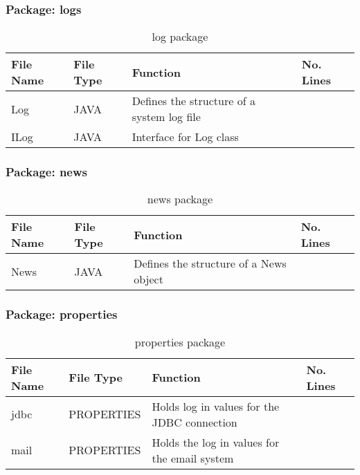 \subsubsection{Package: logs}
\begin{table}[H]
\begin{center}
    \begin{tabular}{| l | l | l| p{1cm} |}
    \hline
    File Name & File Type & Function & No. Lines\\ \hline
    Log & JAVA & Defines the structure of a system log file\\ \hline
	ILog & JAVA & Interface for Log class\\ \hline
    \end{tabular}
\end{center}
\caption{log package}
\end{table}

\subsubsection{Package: news}
\begin{table}[H]
\begin{center}
     \begin{tabular}{| l | l | l| p{1cm} |}
    \hline
    File Name & File Type & Function & No. Lines\\ \hline
    News & JAVA & Defines the structure of a News object\\ \hline
    \end{tabular}
\end{center}
\caption{news package}
\end{table}

\subsubsection{Package: properties}
\begin{table}[H]
\begin{center}
     \begin{tabular}{| l | l | l| p{1cm} |}
    \hline
    File Name & File Type & Function & No. Lines\\ \hline
    jdbc & PROPERTIES & Holds log in values for the JDBC connection\\ \hline
	mail & PROPERTIES & Holds the log in values for the email system\\ \hline
    \end{tabular}
\end{center}
\caption{properties package}
\end{table}

